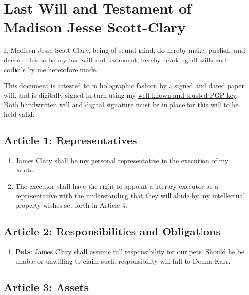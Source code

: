\section*{Last Will and Testament of Madison Jesse Scott-Clary}\label{last-will-and-testament-of-madison-jesse-scott-clary}

I, Madison Jesse Scott-Clary, being of sound mind, do hereby make, publish, and declare this to be my last will and testament, hereby revoking all wills and codicils by me heretofore made.

This document is attested to in holographic fashion by a signed and dated paper will, and is digitally signed in turn using my \href{http://pool.sks-keyservers.net/pks/lookup?search=0x33A1685050029F7D\&op=vindex}{well known and trusted PGP key}. Both handwritten will and digital signature must be in place for this will to be held valid.

\subsection*{Article 1: Representatives}\label{article-1-representatives}

\begin{enumerate}
\def\labelenumi{\arabic{enumi}.}
\tightlist
\item
  James Clary shall be my personal representative in the execution of my estate.
\item
  The executor shall have the right to appoint a literary executor as a representative with the understanding that they will abide by my intellectual property wishes set forth in Article 4.
\end{enumerate}

\subsection*{Article 2: Responsibilities and Obligations}\label{article-2-responsibilities-and-obligations}

\begin{enumerate}
\def\labelenumi{\arabic{enumi}.}
\tightlist
\item
  \textbf{Pets:} James Clary shall assume full responsibility for our pets. Should he be unable or unwilling to claim such, responsibility will fall to Donna Karr.
\end{enumerate}

\subsection*{Article 3: Assets}\label{article-3-assets}

